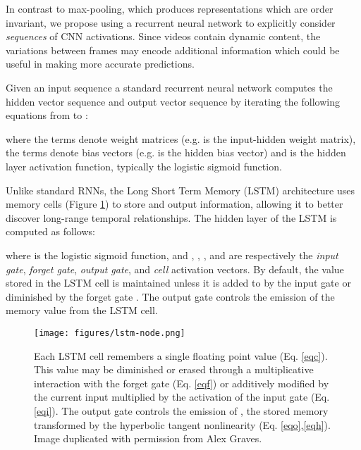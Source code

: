 \documentclass[10pt,twocolumn,letterpaper]{article}
\begin{document}
In contrast to max-pooling, which produces representations which are order
invariant, we propose using a recurrent neural network to explicitly consider
\textit{sequences} of CNN activations. Since videos contain dynamic content,
the variations between frames may encode additional information which could be
useful in making more accurate predictions.

Given an input sequence  a standard recurrent
neural network computes the hidden vector sequence  and output vector sequence  by iterating the following equations from  to
:



\noindent where the  terms denote weight matrices (e.g.  is the
input-hidden weight matrix), the  terms denote bias vectors
(e.g.  is the hidden bias vector) and  is the hidden
layer activation function, typically the logistic sigmoid function.

Unlike standard RNNs, the Long Short Term Memory (LSTM) architecture
\cite{gers02learning} uses memory cells (Figure \ref{fig:lstm_cell})
to store and output information, allowing it to better discover long-range
temporal relationships. The hidden layer  of the
LSTM is computed as follows:



\noindent where  is the logistic sigmoid function, and , , ,
and  are respectively the \textit{input gate}, \textit{forget
  gate}, \textit{output gate}, and \textit{cell} activation
vectors. By default, the value stored in the LSTM cell  is
maintained unless it is added to by the input gate  or diminished
by the forget gate . The output gate  controls the emission of
the memory value from the LSTM cell.

\begin{figure}[t]
\begin{center}
\texttt{[image: figures/lstm-node.png]}
\end{center}
\caption{Each LSTM cell remembers a single floating point value  (Eq. \ref{eqc}). This value may be diminished or erased through a multiplicative interaction with the forget gate  (Eq. \ref{eqf}) or additively modified by the current input  multiplied by the activation of the input gate  (Eq. \ref{eqi}). The output gate  controls the emission of , the stored memory  transformed by the hyperbolic tangent nonlinearity (Eq. \ref{eqo},\ref{eqh}). Image duplicated with permission from Alex Graves.}
\label{fig:lstm_cell}
\end{figure}
\end{document}
